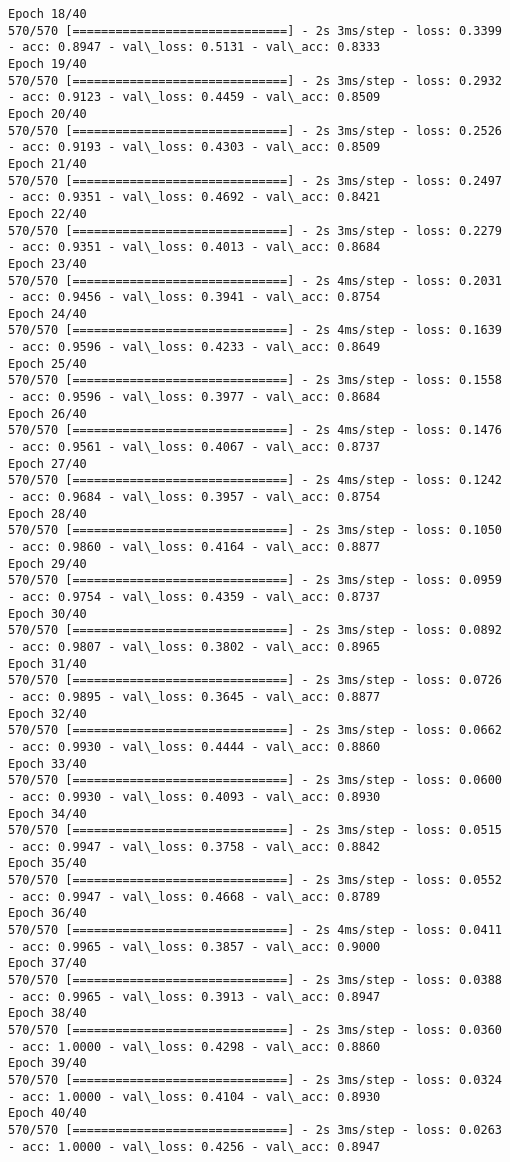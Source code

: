 \documentclass[11pt]{article}
\begin{document}
\begin{Verbatim}[commandchars=\\\{\}]
Epoch 18/40
570/570 [==============================] - 2s 3ms/step - loss: 0.3399 - acc: 0.8947 - val\_loss: 0.5131 - val\_acc: 0.8333
Epoch 19/40
570/570 [==============================] - 2s 3ms/step - loss: 0.2932 - acc: 0.9123 - val\_loss: 0.4459 - val\_acc: 0.8509
Epoch 20/40
570/570 [==============================] - 2s 3ms/step - loss: 0.2526 - acc: 0.9193 - val\_loss: 0.4303 - val\_acc: 0.8509
Epoch 21/40
570/570 [==============================] - 2s 3ms/step - loss: 0.2497 - acc: 0.9351 - val\_loss: 0.4692 - val\_acc: 0.8421
Epoch 22/40
570/570 [==============================] - 2s 3ms/step - loss: 0.2279 - acc: 0.9351 - val\_loss: 0.4013 - val\_acc: 0.8684
Epoch 23/40
570/570 [==============================] - 2s 4ms/step - loss: 0.2031 - acc: 0.9456 - val\_loss: 0.3941 - val\_acc: 0.8754
Epoch 24/40
570/570 [==============================] - 2s 4ms/step - loss: 0.1639 - acc: 0.9596 - val\_loss: 0.4233 - val\_acc: 0.8649
Epoch 25/40
570/570 [==============================] - 2s 3ms/step - loss: 0.1558 - acc: 0.9596 - val\_loss: 0.3977 - val\_acc: 0.8684
Epoch 26/40
570/570 [==============================] - 2s 4ms/step - loss: 0.1476 - acc: 0.9561 - val\_loss: 0.4067 - val\_acc: 0.8737
Epoch 27/40
570/570 [==============================] - 2s 4ms/step - loss: 0.1242 - acc: 0.9684 - val\_loss: 0.3957 - val\_acc: 0.8754
Epoch 28/40
570/570 [==============================] - 2s 3ms/step - loss: 0.1050 - acc: 0.9860 - val\_loss: 0.4164 - val\_acc: 0.8877
Epoch 29/40
570/570 [==============================] - 2s 3ms/step - loss: 0.0959 - acc: 0.9754 - val\_loss: 0.4359 - val\_acc: 0.8737
Epoch 30/40
570/570 [==============================] - 2s 3ms/step - loss: 0.0892 - acc: 0.9807 - val\_loss: 0.3802 - val\_acc: 0.8965
Epoch 31/40
570/570 [==============================] - 2s 3ms/step - loss: 0.0726 - acc: 0.9895 - val\_loss: 0.3645 - val\_acc: 0.8877
Epoch 32/40
570/570 [==============================] - 2s 3ms/step - loss: 0.0662 - acc: 0.9930 - val\_loss: 0.4444 - val\_acc: 0.8860
Epoch 33/40
570/570 [==============================] - 2s 3ms/step - loss: 0.0600 - acc: 0.9930 - val\_loss: 0.4093 - val\_acc: 0.8930
Epoch 34/40
570/570 [==============================] - 2s 3ms/step - loss: 0.0515 - acc: 0.9947 - val\_loss: 0.3758 - val\_acc: 0.8842
Epoch 35/40
570/570 [==============================] - 2s 3ms/step - loss: 0.0552 - acc: 0.9947 - val\_loss: 0.4668 - val\_acc: 0.8789
Epoch 36/40
570/570 [==============================] - 2s 4ms/step - loss: 0.0411 - acc: 0.9965 - val\_loss: 0.3857 - val\_acc: 0.9000
Epoch 37/40
570/570 [==============================] - 2s 3ms/step - loss: 0.0388 - acc: 0.9965 - val\_loss: 0.3913 - val\_acc: 0.8947
Epoch 38/40
570/570 [==============================] - 2s 3ms/step - loss: 0.0360 - acc: 1.0000 - val\_loss: 0.4298 - val\_acc: 0.8860
Epoch 39/40
570/570 [==============================] - 2s 3ms/step - loss: 0.0324 - acc: 1.0000 - val\_loss: 0.4104 - val\_acc: 0.8930
Epoch 40/40
570/570 [==============================] - 2s 3ms/step - loss: 0.0263 - acc: 1.0000 - val\_loss: 0.4256 - val\_acc: 0.8947

    \end{Verbatim}
\end{document}
